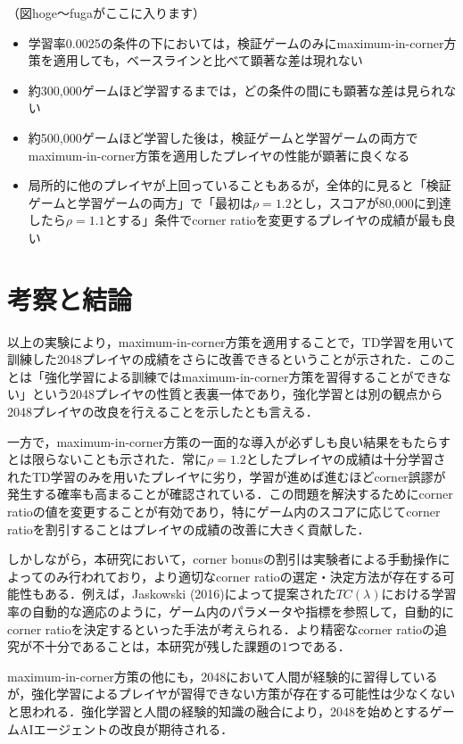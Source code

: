 \documentclass{suribt}
\begin{document}
（図hoge〜fugaがここに入ります）

\begin{itemize}
\item 学習率0.0025の条件の下においては，検証ゲームのみにmaximum-in-corner方策を適用しても，ベースラインと比べて顕著な差は現れない
\item 約300,000ゲームほど学習するまでは，どの条件の間にも顕著な差は見られない
\item 約500,000ゲームほど学習した後は，検証ゲームと学習ゲームの両方でmaximum-in-corner方策を適用したプレイヤの性能が顕著に良くなる
\item 局所的に他のプレイヤが上回っていることもあるが，全体的に見ると「検証ゲームと学習ゲームの両方」で「最初は${\rho}=1.2$とし，スコアが80,000に到達したら${\rho}=1.1$とする」条件でcorner ratioを変更するプレイヤの成績が最も良い
\end{itemize}

\chapter{考察と結論}
以上の実験により，maximum-in-corner方策を適用することで，TD学習を用いて訓練した2048プレイヤの成績をさらに改善できるということが示された．このことは「強化学習による訓練ではmaximum-in-corner方策を習得することができない」という2048プレイヤの性質と表裏一体であり，強化学習とは別の観点から2048プレイヤの改良を行えることを示したとも言える．

一方で，maximum-in-corner方策の一面的な導入が必ずしも良い結果をもたらすとは限らないことも示された．常に${\rho}=1.2$としたプレイヤの成績は十分学習されたTD学習のみを用いたプレイヤに劣り，学習が進めば進むほどcorner誤謬が発生する確率も高まることが確認されている．この問題を解決するためにcorner ratioの値を変更することが有効であり，特にゲーム内のスコアに応じてcorner ratioを割引することはプレイヤの成績の改善に大きく貢献した．

しかしながら，本研究において，corner bonusの割引は実験者による手動操作によってのみ行われており，より適切なcorner ratioの選定・決定方法が存在する可能性もある．例えば，Jaskowski (2016)によって提案された$TC({\lambda})$における学習率の自動的な適応のように，ゲーム内のパラメータや指標を参照して，自動的にcorner ratioを決定するといった手法が考えられる．より精密なcorner ratioの追究が不十分であることは，本研究が残した課題の1つである．

maximum-in-corner方策の他にも，2048において人間が経験的に習得しているが，強化学習によるプレイヤが習得できない方策が存在する可能性は少なくないと思われる．強化学習と人間の経験的知識の融合により，2048を始めとするゲームAIエージェントの改良が期待される．
\end{document}
